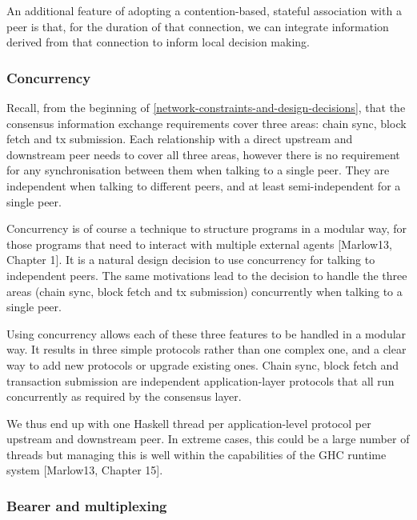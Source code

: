 \documentclass[11pt,a4paper]{article}
\begin{document}
An additional feature of adopting a contention-based, stateful
association with a peer is that, for the duration of that connection, we
can integrate information derived from that connection to inform local
decision making.

\subsubsection{Concurrency}
\label{concurrency}

Recall, from the beginning of
\cref{network-constraints-and-design-decisions}, that the consensus information exchange requirements cover three
areas: chain sync, block fetch and tx submission. Each relationship with
a direct upstream and downstream peer needs to cover all three areas,
however there is no requirement for any synchronisation between them
when talking to a single peer. They are independent when talking to
different peers, and at least semi-independent for a single peer.

Concurrency is of course a technique to structure programs in a modular
way, for those programs that need to interact with multiple external
agents {[}Marlow13, Chapter 1{]}. It is a natural design decision to use
concurrency for talking to independent peers. The same motivations lead
to the decision to handle the three areas (chain sync, block fetch and
tx submission) concurrently when talking to a single peer.

Using concurrency allows each of these three features to be handled in a
modular way. It results in three simple protocols rather than one
complex one, and a clear way to add new protocols or upgrade existing
ones. Chain sync, block fetch and transaction submission are independent
application-layer protocols that all run concurrently as required by the
consensus layer.

We thus end up with one Haskell thread per application-level protocol
per upstream and downstream peer. In extreme cases, this could be a
large number of threads but managing this is well within the
capabilities of the GHC runtime system {[}Marlow13, Chapter 15{]}.

\subsubsection{Bearer and multiplexing}
\label{bearer-and-multiplexing}
\end{document}
